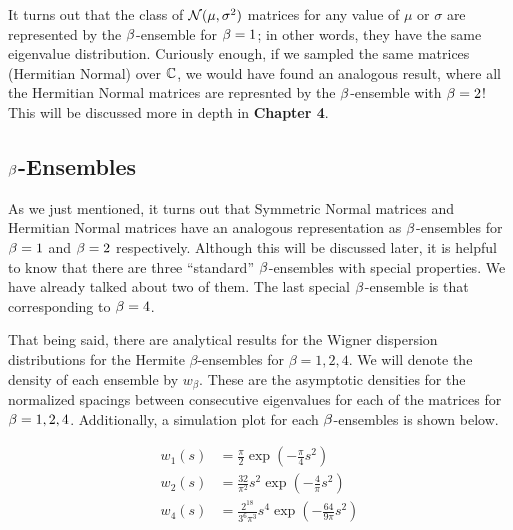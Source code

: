 It turns out that the class of $\mathcal{N}(\mu,\sigma^2)$ matrices for any value of $\mu$ or $\sigma$ are represented by the $\beta$-ensemble for $\beta = 1$;
in other words, they have the same eigenvalue distribution.
Curiously enough, if we sampled the same matrices (Hermitian Normal) over $\mathbb{C}$, we would have found an analogous result, where all the Hermitian Normal
matrices are represnted by the $\beta$-ensemble with $\beta = 2$! This will be discussed more in depth in \textbf{Chapter 4}.

\newpage
\subsection{$\beta$-Ensembles}

As we just mentioned, it turns out that Symmetric Normal matrices and Hermitian Normal matrices have an analogous representation as $\beta$-ensembles for $\beta = 1$ and $\beta = 2$ respectively. Although this will be discussed later, it is helpful to know that there are three ``standard'' $\beta$-ensembles with special properties. We have already talked about two of them. The last special $\beta$-ensemble is that corresponding to $\beta = 4$.

That being said, there are analytical results for the Wigner dispersion distributions for the Hermite $\beta$-ensembles for $\beta = 1, 2, 4$.
We will denote the density of each ensemble by $w_\beta$. These are the asymptotic densities for the normalized spacings between consecutive eigenvalues for each of the matrices for $\beta = 1,2,4$. %
Additionally, a simulation plot for each $\beta$-ensembles is shown below.

\begin{align*}
  w_1(s) &= \frac{\pi}{2} \exp(-\frac{\pi}{4}s^2) \\
  w_2(s) &= \frac{32}{\pi^2} s^2 \exp(-\frac{4}{\pi}s^2) \\
  w_4(s) &= \frac{2^{18}}{3^{6}\pi^3} s^4 \exp(-\frac{64}{9\pi}s^2)
\end{align*}

\trim
{}%

\newpage

